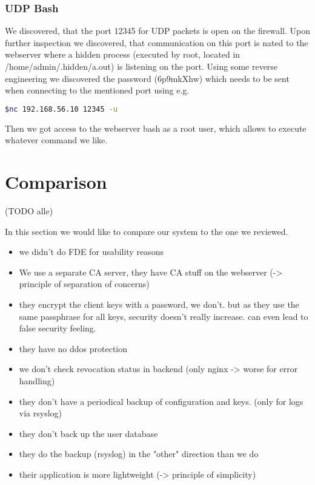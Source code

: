 \documentclass[english]{article}
\begin{document}
\subsubsection{UDP Bash}
We discovered, that the port 12345 for UDP packets is open on the firewall. Upon further inspection we discovered, that communication on this port is nated to the webserver where a hidden process (executed by root, located in /home/admin/.hidden/a.out) is listening on the port. Using some reverse engineering we discovered the password (6p9mkXhw) which needs to be sent when connecting to the mentioned port using e.g.
\begin{lstlisting}[language=bash]
$nc 192.168.56.10 12345 -u
\end{lstlisting}

Then we got access to the webserver bash as a root user, which allows to execute whatever command we like.

\section{Comparison} (TODO alle)

In this section we would like to compare our system to the one we reviewed.

\begin{itemize}
	\item we didn't do FDE for usability reasons
	\item We use a separate CA server, they have CA stuff on the webserver (-> principle of separation of concerns)
	\item they encrypt the client keys with a password, we don't. but as they use the same passphrase for all keys, security doesn't really increase. can even lead to false security feeling.
	\item they have no ddos protection
	\item we don't check revocation status in backend (only nginx -> worse for error handling)
	\item they don't have a periodical backup of configuration and keys. (only for logs via rsyslog)
	\item they don't back up the user database
	\item they do the backup (rsyslog) in the "other" direction than we do		
	\item their application is more lightweight (-> principle of simplicity)
	
	
\end{itemize}
\end{document}
